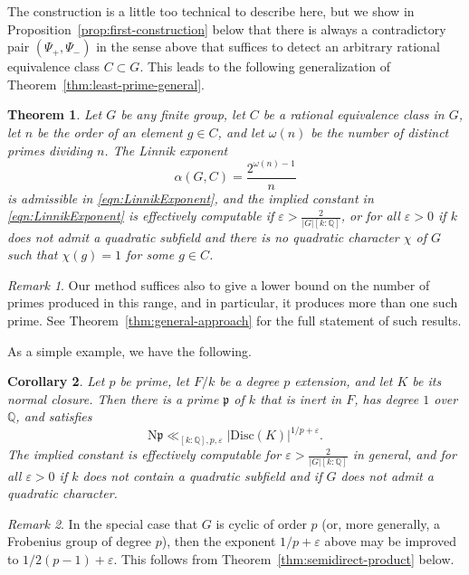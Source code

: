 \documentclass[12pt]{amsart}
\newtheorem{theorem}{Theorem}
\newtheorem{corollary}[theorem]{Corollary}
\theoremstyle{definition} \newtheorem{definition}[theorem]{Definition}
\theoremstyle{example} \newtheorem{example}[theorem]{Example}
\theoremstyle{remark} \newtheorem{remark}{Remark}[theorem]
\numberwithin{equation}{section}
\numberwithin{theorem}{section}
\renewcommand{\epsilon}{\varepsilon}
\newcommand{\N}{\mathrm{N}} %
\newcommand{\Q}{\mathbb{Q}}
\begin{document}
	The construction is a little too technical to describe here, but we show in Proposition~\ref{prop:first-construction} below that there is always a contradictory pair $(\Psi_+,\Psi_-)$ in the sense above that suffices to detect an arbitrary rational equivalence class $C \subset G$.  This leads to the following generalization of Theorem~\ref{thm:least-prime-general}.
	
	\begin{theorem}\label{thm:least-prime-rational-class-intro}
		Let $G$ be any finite group, let $C$ be a rational equivalence class in $G$, let $n$ be the order of an element $g \in C$, and let $\omega(n)$ be the number of distinct primes dividing $n$.  The Linnik exponent
			\[
			\alpha(G,C) = \frac{2^{\omega(n)-1}}{n}
			\]
		is admissible in \eqref{eqn:LinnikExponent}, and the implied constant in \eqref{eqn:LinnikExponent} is effectively computable if $\epsilon > \frac{2}{
		|G|[k:\mathbb{Q}]}$, or for all $\epsilon>0$ if $k$ does not admit a quadratic subfield and there is no quadratic character $\chi$ of $G$ such that $\chi(g) = 1$ for some $g \in C$.
	\end{theorem}
	
	\begin{remark}
		Our method suffices also to give a lower bound on the number of primes produced in this range, and in particular, it produces more than one such prime.  See Theorem~\ref{thm:general-approach} for the full statement of such results.
	\end{remark}
		
	As a simple example, we have the following.
	
	\begin{corollary}
		Let $p$ be prime, let $F/k$ be a degree $p$ extension, and let $K$ be its normal closure.  
		Then there is a prime $\mathfrak{p}$ of $k$ that is inert in $F$, has degree $1$ over $\Q$, and satisfies
			\[
				\N\mathfrak{p} \ll_{[k:\Q],p,\epsilon} |\mathrm{Disc}(K)|^{1/p + \epsilon}.
			\]
		The implied constant is effectively computable for $\epsilon > \frac{2}{|G|[k:\mathbb{Q}]}$ in general, and for all $\epsilon > 0$ if $k$ does not contain a quadratic subfield and if $G$ does not admit a quadratic character.
	\end{corollary}
	\begin{remark}
		In the special case that $G$ is cyclic of order $p$ (or, more generally, a Frobenius group of degree $p$), then the exponent $1/p + \epsilon$ above may be improved to $1/2(p-1) + \epsilon$.  This follows from Theorem~\ref{thm:semidirect-product} below.
	\end{remark}
	
\end{document}
